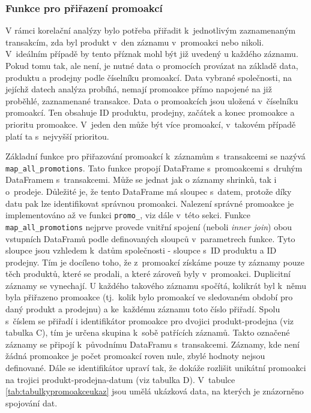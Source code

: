

\subsubsection*{Funkce pro přiřazení promoakcí}

V rámci korelační analýzy bylo potřeba přiřadit k~jednotlivým zaznamenaným transakcím, zda byl produkt v~den záznamu v~promoakci nebo nikoli. V~ideálním případě by tento příznak mohl být již uvedený u každého záznamu. Pokud tomu tak, ale není, je nutné data o promocích provázat na základě data, produktu a prodejny podle číselníku promoakcí. Data vybrané společnosti, na jejíchž datech analýza probíhá, nemají promoakce přímo napojené na již proběhlé, zaznamenané transakce. Data o promoakcích jsou uložená v~číselníku promoakcí. Ten obsahuje ID produktu, prodejny, začátek a konec promoakce a prioritu promoakce. V~jeden den může být více promoakcí, v~takovém případě platí ta s~nejvyšší prioritou.

Základní funkce pro přiřazování promoakcí k~záznamům s~transakcemi se nazývá \texttt{map\_all\_promotions}. Tato funkce propojí DataFrame s~promoakcemi s~druhým DataFramem s~transakcemi. Může se jednat jak o záznamy shrinků, tak i o~prodeje. Důležité je, že tento DataFrame má sloupec s~datem, protože díky datu pak lze identifikovat správnou promoakci. Nalezení správné promoakce je implementováno až ve funkci \texttt{promo\_}, viz dále v~této sekci. Funkce \texttt{map\_all\_promotions} nejprve provede vnitřní spojení (neboli \emph{inner join}) obou vstupních DataFramů podle definovaných sloupců v~parametrech funkce. Tyto sloupce jsou vzhledem k~datům společnosti - sloupce s~ID produktu a ID prodejny. Tím je docíleno toho, že z~promoakcí získáme pouze ty záznamy pouze těch produktů, které se prodali, a které zároveň byly v~promoakci. Duplicitní záznamy se vynechají. U každého takového záznamu spočítá, kolikrát byl k~němu byla přiřazeno promoakce (tj.~kolik bylo promoakcí ve sledovaném období pro daný produkt a prodejnu) a ke~každému záznamu toto číslo přiřadí. Spolu s~číslem se přiřadí i identifikátor promoakce pro dvojici produkt-prodejna (viz tabulka C), tím je určena skupina k~sobě patřících záznamů. Takto označené záznamy se připojí k~původnímu DataFramu s~transakcemi. Záznamy, kde není žádná promoakce je počet promoakcí roven nule, zbylé hodnoty nejsou definované.
Dále se identifikátor upraví tak, že dokáže rozlišit unikátní promoakci na trojici produkt-prodejna-datum (viz tabulka D). V~tabulce \ref*{tab:tabulkypromoakceukaz} jsou umělá ukázková data, na kterých je znázorněno spojování dat.

